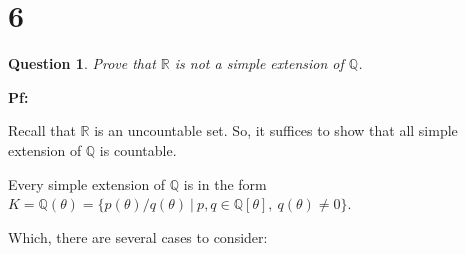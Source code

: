 \documentclass{article}
\newtheorem{question}{Question}
\begin{document}
\break

\section*{6}
\begin{myBox}[]{}
    \begin{question}
        Prove that $\mathbb{R}$ is not a simple extension of $\mathbb{Q}$.
    \end{question}
\end{myBox}

\textbf{Pf:}

Recall that $\mathbb{R}$ is an uncountable set. So, it suffices to show that all simple extension of $\mathbb{Q}$ is countable.

Every simple extension of $\mathbb{Q}$ is in the form $K=\mathbb{Q}(\theta) = \{p(\theta)/q(\theta)\ |\ p,q\in \mathbb{Q}[\theta],\ q(\theta)\neq 0\}$.

Which, there are several cases to consider:
\end{document}
